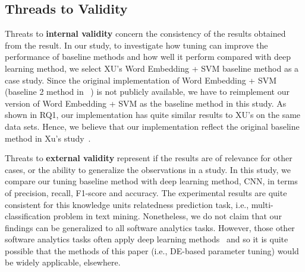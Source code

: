 \documentclass[sigconf]{acmart}
\theoremstyle{break}
\begin{document}
 


 
\subsection{Threads to Validity}

Threats to \textbf{internal validity} concern the consistency of the results 
obtained from the result. In our study,  to investigate how
tuning can improve the performance of baseline methods and how well
it perform compared with deep learning method, we select
XU's  Word Embedding + SVM baseline method as a case study. Since the original implementation of 
Word Embedding + SVM (baseline 2 method in ~\cite{xu2016predicting}) is not 
publicly available, we have to reimplement our version of Word Embedding + SVM as
the baseline method in this study. As shown in RQ1, our implementation has
quite similar results to XU's on the same data sets. Hence, we believe that our implementation reflect the original
 baseline method in Xu's study~\cite{xu2016predicting}. 
 
 

 
 
 Threats to \textbf{external validity} represent if the results are of relevance for
 other cases, or the ability to generalize the observations in a study. In this study,
 we compare our tuning baseline method with deep learning method, CNN, in terms of
 precision, recall, F1-score and accuracy. The experimental results are quite consistent
 for this knowledge units relatedness prediction task, i.e.,  multi-classification problem in text mining. 
 Nonetheless, we do not claim that our findings can be generalized to all software analytics tasks. 
 However, those other software analytics tasks often apply deep learning
 methods~\cite{choetkiertikul2016deep, wang2016automatically} 
 and so it is quite possible that
 the methods  of this paper (i.e., DE-based parameter tuning) would
 be widely applicable, elsewhere.
 
 
\end{document}
